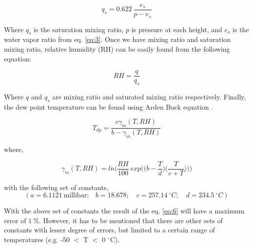 \documentclass[a4paper,12pt]{article}
\numberwithin{equation}{section} %
\begin{document}
\vspace{0.25cm}
\begin{equation}\label{eq:4}
q_s = 0.622 \: \frac{e_s}{p - e_s}
\end{equation}
\vspace{0.25cm}

Where $q_s$ is the saturation mixing ratio, $p$ is pressure at each height, and $e_s$ is the water vapor ratio from eq. \ref{eq:3}. Once we have mixing ratio and saturation mixing ratio, relative humidity (RH) can be easily found from the following equation:

\vspace{0.25cm}
\begin{equation}\label{eq:5}
RH=\frac{q}{q_s}
\end{equation}
\vspace{0.25cm}

Where $q$ and $q_s$ are mixing ratio and saturated mixing ratio respectively. Finally, the dew point temperature can be found using Arden Buck equation \citep{arden}.

\vspace{0.25cm}
\begin{equation}\label{eq:6}
T_{dp} = \frac{c\gamma_m(T,RH)}{b - \gamma_m (T,RH)}
\end{equation}

where,

\begin{equation}
\gamma_m(T,RH) = ln\Bigg(\frac{RH}{100}\: exp\Big(\Big(b - \frac{T}{d}\Big)\Big(\frac{T}{c+T}\Big)\Big)\Bigg)
\end{equation}

\vspace{0.25cm}

with the following set of constants,
\begin{equation*}
(a = 6.1121\: \text{millibar;} \quad b = 18.678; \quad c = 257.14 \:^\circ C; \quad d = 234.5 \: ^\circ C)
\end{equation*}

\vspace{0.25cm}

With the above set of constants the result of the eq. \ref{eq:6} will have a maximum error of $1\: \%$. However, it has to be mentioned that there are other sets of constants with lesser degree of errors, but limited to a certain range of temperatures (e.g. -50 $<$ T $<$ 0 $^\circ$C). %
\end{document}
